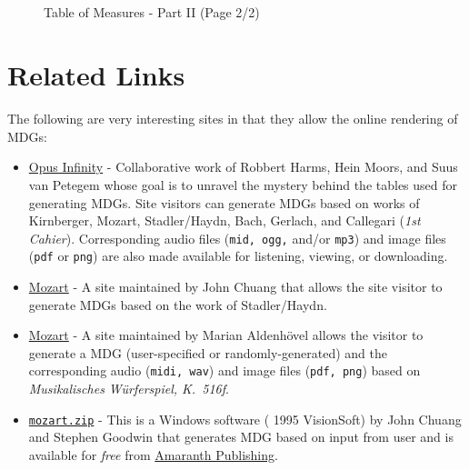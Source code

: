 \documentclass[a4paper,x11names,svgnames,10pt]{article}
\begin{document}
{\newpage
${}_{}$\\
\vspace{0.10in}
\begin{figure}[H]
	\centering
	\def\svgwidth{0.975\columnwidth}
	
	\caption{Table of Measures - Part II (Page 2/2)}
	\label{fig:meas4}
\end{figure}



\section{Related Links}
The following are very interesting sites in that they allow the online rendering of MDGs:
\begin{itemize}
	\item \href{https://opus-infinity.org}{Opus Infinity} - Collaborative work of Robbert Harms, Hein Moors, and Suus van Petegem whose goal is to unravel the mystery behind the tables used for generating MDGs.  Site visitors can generate MDGs based on works of Kirnberger, Mozart, Stadler/Haydn, Bach, Gerlach, and Callegari ({\it 1st Cahier}).  Corresponding audio files ({\tt mid, ogg,} and/or {\tt mp3}) and image files ({\tt pdf} or {\tt png}) are also made available for listening, viewing, or downloading.
	
	\item  \href{http://sunsite.univie.ac.at/Mozart/dice/}{Mozart} - A site maintained by John Chuang that allows the site visitor to generate MDGs based on the work of Stadler/Haydn.
	
	\item  \href{https://marian-aldenhoevel.de/mozart/}{Mozart} - A site maintained by Marian Aldenh\"{o}vel allows the visitor to generate a MDG (user-specified or randomly-generated) and the corresponding audio ({\tt midi, wav}) and image files ({\tt pdf, png}) based on {\em Musikalisches W\"{u}rferspiel, K.\ 516f}.
	
	\item \href{https://www.amaranthpublishing.com/mozart.zip}{\tt mozart.zip} -  This is a Windows software ({\small\textcopyright} 1995 VisionSoft) by John Chuang and Stephen Goodwin that generates MDG based on input from user and is available for {\it free} from  \href{http://www.amaranthpublishing.com/MozartDiceGame.htm}{Amaranth Publishing}.  
	

\end{itemize}}
\end{document}
